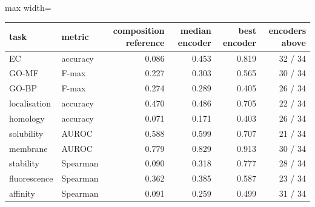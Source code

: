 \begin{adjustbox}{max width=\linewidth}
\begin{tabular}{llrrrr}
\toprule
\rowcolor{CompassLavender!32}
task & metric & composition reference & median encoder & best encoder & encoders above \\
\midrule
EC & accuracy & 0.086 & 0.453 & 0.819 & 32 / 34 \\
GO-MF & F-max & 0.227 & 0.303 & 0.565 & 30 / 34 \\
GO-BP & F-max & 0.274 & 0.289 & 0.405 & 26 / 34 \\
localisation & accuracy & 0.470 & 0.486 & 0.705 & 22 / 34 \\
homology & accuracy & 0.071 & 0.171 & 0.403 & 26 / 34 \\
solubility & AUROC & 0.588 & 0.599 & 0.707 & 21 / 34 \\
membrane & AUROC & 0.779 & 0.829 & 0.913 & 30 / 34 \\
stability & Spearman & 0.090 & 0.318 & 0.777 & 28 / 34 \\
fluorescence & Spearman & 0.362 & 0.385 & 0.587 & 23 / 34 \\
affinity & Spearman & 0.091 & 0.259 & 0.499 & 31 / 34 \\
\bottomrule
\end{tabular}
\end{adjustbox}
